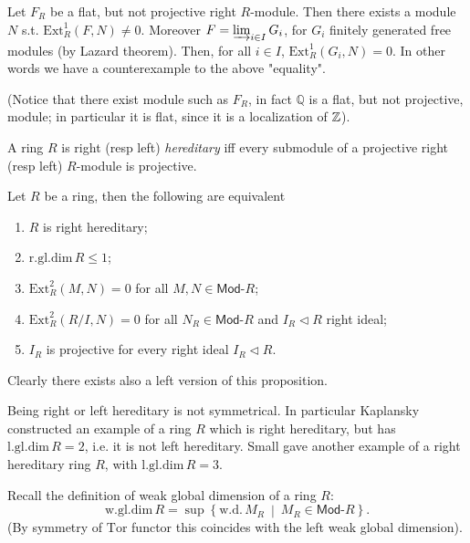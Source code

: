 \begin{ex}
	Let $F_R$ be a flat, but not projective right $R$-module.
	Then there exists a module $N$ s.t. $\mathrm{Ext}^1_R(F,N) \neq 0$.
	Moreover $F = \varinjlim_{i \in I} G_i$,
	for $G_i$ finitely generated free modules (by Lazard theorem).
	Then, for all $i \in I$, $\mathrm{Ext}^1_R(G_i, N) = 0$.
	In other words we have a counterexample to the above "equality".

	(Notice that there exist module such as $F_R$, in fact $\mathbb{Q}$
	is a flat, but not projective, module;
	in particular it is flat, since it is a localization of $\mathbb{Z}$).
\end{ex} 

\begin{defn}
	A ring $R$ is right (resp left) {\em hereditary} iff every submodule of a projective right
	(resp left) $R$-module is projective.
\end{defn}

\begin{prop}
	Let $R$ be a ring, then the following are equivalent
	\begin{enumerate}
		\item $R$ is right hereditary;
		\item $\mathrm{r.gl.dim}\, R \leq 1$;
		\item $\mathrm{Ext}^2_R(M,N) = 0$ for all $M, N \in \mathsf{Mod}\text{-}R$;
		\item $\mathrm{Ext}^2_R(R/I,N) = 0$ for all $N_R \in \mathsf{Mod}\text{-}R$ and $I_R \triangleleft R$
			right ideal;
		\item $I_R$ is projective for every right ideal $I_R \triangleleft R$.
	\end{enumerate}
	Clearly there exists also a left version of this proposition.
\end{prop} 

\begin{ex}
	Being right or left hereditary is not symmetrical.
	In particular Kaplansky constructed an example of a ring $R$ which is right hereditary,
	but has $\mathrm{l.gl.dim}\, R = 2$, i.e. it is not left hereditary.
	Small gave another example of a right hereditary ring $R$, 
	with $\mathrm{l.gl.dim}\, R = 3$.
\end{ex} 

Recall the definition of weak global dimension of a ring $R$:
\begin{equation}
\mathrm{w.gl.dim}\, R = \sup \left\{ \mathrm{w.d.}\, M_R \ \middle|\ M_R \in \mathsf{Mod}\text{-}R \right\}
.\end{equation} 
(By symmetry of $\mathrm{Tor}$ functor this coincides with the left weak global dimension).


